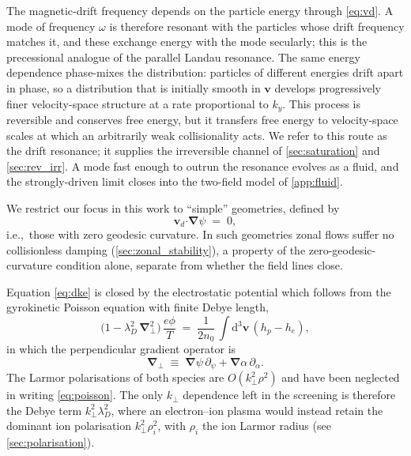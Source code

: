 \documentclass{jpp}
\newcommand{\order}[1]{O\left(#1\right)}
\newcommand{\rmd}{\text{d}}
\newcommand{\bv}{\mathbf{v}}
\renewcommand{\vec}[1]{\boldsymbol{#1}}
\newcommand{\vec}[1]{\boldsymbol{#1}}
\providecommand{\bcdot}{\vec{\cdot}}
\newcommand{\grad}{{\vec{\nabla}}}
\newcommand{\kperp}{k_\perp}
\newcommand{\lambdaD}{\lambda_D}
\begin{document}
The magnetic-drift frequency depends on the particle energy through \cref{eq:vd}. A mode of frequency $\omega$ is therefore resonant with the particles whose drift frequency matches it, and these exchange energy with the mode secularly; this is the precessional analogue of the parallel Landau resonance. The same energy dependence phase-mixes the distribution: particles of different energies drift apart in phase, so a distribution that is initially smooth in $\bv$ develops progressively finer velocity-space structure at a rate proportional to $k_y$. This process is reversible and conserves free energy, but it transfers free energy to velocity-space scales at which an arbitrarily weak collisionality acts. We refer to this route as the drift resonance; it supplies the irreversible channel of \cref{sec:saturation} and \cref{sec:rev_irr}. A mode fast enough to outrun the resonance evolves as a fluid, and the strongly-driven limit closes into the two-field model of \cref{app:fluid}.

We restrict our focus in this work to ``simple'' geometries, defined by
\begin{equation}\label{eq:simple_geom}
\vec{v}_d\bcdot\grad\psi \;=\; 0,
\end{equation}
i.e.,\ those with zero geodesic curvature. In such geometries zonal flows suffer no collisionless damping (\cref{sec:zonal_stability}), a property of the zero-geodesic-curvature condition alone, separate from whether the field lines close.

Equation \cref{eq:dke} is closed by the electrostatic potential which follows from the gyrokinetic Poisson equation with finite Debye length,
\begin{equation}\label{eq:poisson}
\bigl(1 - \lambdaD^2\, \grad_\perp^2\bigr)\, \frac{e\phi}{T} \;=\; \frac{1}{2 n_0}\, \int \rmd^3 \mathbf{v} \, (h_p - h_e),
\end{equation}
in which the perpendicular gradient operator is
\begin{equation}\label{eq:debye_def}
\grad_\perp \;\equiv\; \grad\psi\, \partial_\psi + \grad\alpha\, \partial_\alpha .
\end{equation}
The Larmor polarisations of both species are $\order{\kperp^2\rho^2}$ and have been neglected in writing \cref{eq:poisson}. The only $\kperp$ dependence left in the screening is therefore the Debye term $\kperp^2\lambdaD^2$, where an electron--ion plasma would instead retain the dominant ion polarisation $\kperp^2\rho_i^2$, with $\rho_i$ the ion Larmor radius (see \cref{sec:polarisation}).
\end{document}
